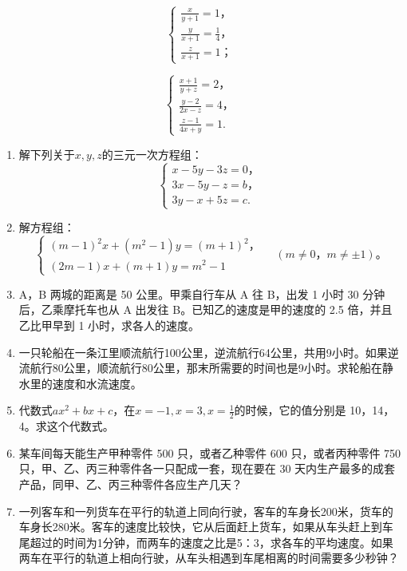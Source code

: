 \[
\left\{ \begin{array}{l} \frac{x}{y + 1} = 1\text{，} \\ \frac{y}{x + 1} = \frac{1}{4}\text{，} \\ \frac{z}{x + 1} = 1\text{；} \end{array} \right. \tag{1}
\]

\[
\left\{ \begin{array}{l} \frac{x + 1}{y + z} = 2\text{，} \\ \frac{y - 2}{2 x - z} = 4\text{，} \\ \frac{z - 1}{4 x + y} = 1. \end{array} \right. \tag{2}
\]

\begin{enumerate}[start=5]
\item
  解下列关于\(x, y, z\)的三元一次方程组：
\[
\left\{ \begin{array}{l} x - 5 y - 3 z = 0\text{，} \\ 3 x - 5 y - z = b\text{，} \\ 3 y - x + 5 z = c. \end{array} \right.
\]
\item
  解方程组：
\[
\left\{ \begin{array}{l} (m - 1) ^ {2} x + (m ^ {2} - 1) y = (m + 1) ^ {2}\text{，} \\ (2 m - 1) x + (m + 1) y = m ^ {2} - 1 \end{array} \right. \quad (m \neq 0\text{，} m \neq \pm 1)\text{。}
\]
\item
  A，B 两城的距离是 50 公里。甲乘自行车从 A 往 B，出发 1 小时 30
  分钟后，乙乘摩托车也从 A 出发往 B。已知乙的速度是甲的速度的 2.5
  倍，并且乙比甲早到 1 小时，求各人的速度。
\item
  一只轮船在一条江里顺流航行100公里，逆流航行64公里，共用9小时。如果逆流航行80公里，顺流航行80公里，那末所需要的时间也是9小时。求轮船在静水里的速度和水流速度。
\item
  代数式\(ax^2 + bx + c\)，在\(x = -1, x = 3, x = \frac{1}{2}\)的时候，它的值分别是
  10，14，4。求这个代数式。
\item
  某车间每天能生产甲种零件 500 只，或者乙种零件 600 只，或者丙种零件 750
  只，甲、乙、丙三种零件各一只配成一套，现在要在 30
  天内生产最多的成套产品，同甲、乙、丙三种零件各应生产几天？
\item
  一列客车和一列货车在平行的轨道上同向行驶，客车的车身长200米，货车的车身长280米。客车的速度比较快，它从后面赶上货车，如果从车头赶上到车尾超过的时间为1分钟，而两车的速度之比是5：3，求各车的平均速度。如果两车在平行的轨道上相向行驶，从车头相遇到车尾相离的时间需要多少秒钟？
\end{enumerate}


